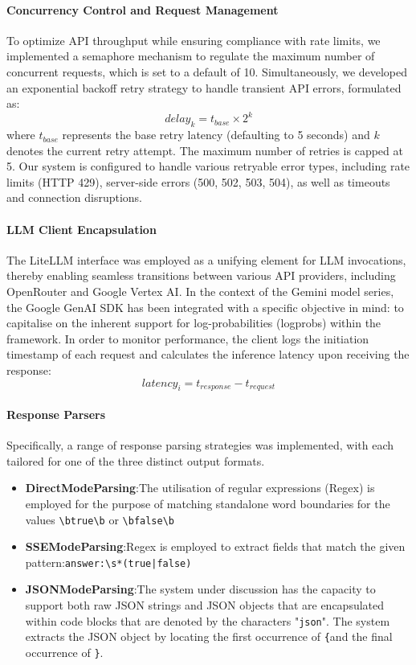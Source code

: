 \paragraph{Concurrency Control and Request Management}
To optimize API throughput while ensuring compliance with rate limits, we implemented a semaphore mechanism to regulate the maximum number of concurrent requests, which is set to a default of 10. Simultaneously, we developed an exponential backoff retry strategy to handle transient API errors, formulated as:
$$
delay_k = t_{base} \times 2^k
$$
where $t_{base}$ represents the base retry latency (defaulting to 5 seconds) and $k$ denotes the current retry attempt. The maximum number of retries is capped at 5. Our system is configured to handle various retryable error types, including rate limits (HTTP 429), server-side errors (500, 502, 503, 504), as well as timeouts and connection disruptions.

\paragraph{LLM Client Encapsulation}
The LiteLLM interface was employed as a unifying element for LLM invocations, thereby enabling seamless transitions between various API providers, including OpenRouter and Google Vertex AI. In the context of the Gemini model series, the Google GenAI SDK has been integrated with a specific objective in mind: to capitalise on the inherent support for log-probabilities (logprobs) within the framework. In order to monitor performance, the client logs the initiation timestamp of each request and calculates the inference latency upon receiving the response:
$$
latency_i = t_{response} - t_{request}
$$

\paragraph{Response Parsers}

Specifically, a range of response parsing strategies was implemented, with each tailored for one of the three distinct output formats.

\begin{itemize}
\item \textbf{DirectModeParsing}:The utilisation of regular expressions (Regex) is employed for the purpose of matching standalone word boundaries for the values \texttt{\textbackslash btrue\textbackslash b} or \texttt{\textbackslash bfalse\textbackslash b}
\item \textbf{SSEModeParsing}:Regex is employed to extract fields that match the given pattern:\texttt{answer:\textbackslash s*(true|false)}
\item \textbf{JSONModeParsing}:The system under discussion has the capacity to support both raw JSON strings and JSON objects that are encapsulated within code blocks that are denoted by the characters "\texttt{json}". The system extracts the JSON object by locating the first occurrence of \texttt{\{}and the final occurrence of \texttt{\}}.
\end{itemize}

